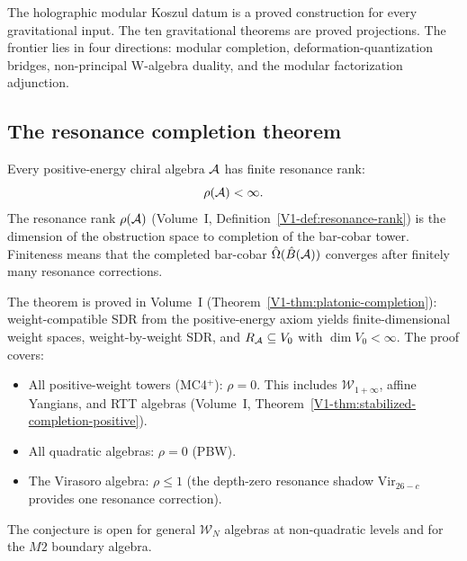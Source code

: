 The holographic modular Koszul datum is a proved construction for
every gravitational input. The ten gravitational theorems are
proved projections. The frontier lies in four directions:
modular completion, deformation-quantization bridges, non-principal
W-algebra duality, and the modular factorization adjunction.

\subsection{The resonance completion theorem}

\begin{theorem}
Every positive-energy chiral algebra $\mathcal{A}$ has finite resonance rank:
\begin{equation}%
\rho(\cA) < \infty.
\end{equation}
The resonance rank $\rho(\mathcal{A})$
(Volume~I, Definition~\ref{V1-def:resonance-rank}) is the dimension of
the obstruction space to completion of the bar-cobar tower. Finiteness
means that the completed bar-cobar
$\hat\Omega(\hat B(\mathcal{A}))$ converges after finitely many resonance
corrections.
\end{theorem}

\begin{remark}
The theorem is proved in Volume~I
(Theorem~\ref{V1-thm:platonic-completion}):
weight-compatible SDR from the positive-energy axiom yields
finite-dimensional weight spaces, weight-by-weight SDR,
and $R_{\mathcal{A}} \subseteq V_0$ with $\dim V_0 < \infty$.
The proof covers:
\begin{itemize}
\item All positive-weight towers (MC4$^+$): $\rho = 0$.
 This includes $\mathcal{W}_{1+\infty}$, affine Yangians,
 and RTT algebras (Volume~I, Theorem~\ref{V1-thm:stabilized-completion-positive}).
\item All quadratic algebras: $\rho = 0$ (PBW).
\item The Virasoro algebra: $\rho \le 1$ (the depth-zero resonance
 shadow $\mathrm{Vir}_{26-c}$ provides one resonance correction).
\end{itemize}
The conjecture is open for general $\mathcal{W}_N$ algebras at
non-quadratic levels and for the $M2$ boundary algebra.
\end{remark}


